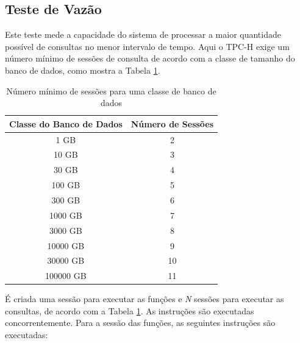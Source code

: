 \documentclass[conference]{IEEEtran}
\begin{document}
\subsection{Teste de Vazão}
\label{through_test}
Este teste mede a capacidade do sistema de processar a maior quantidade possível de consultas no menor intervalo de tempo. Aqui o TPC-H exige um número mínimo de sessões de consulta de acordo com a classe de tamanho do banco de dados, como mostra a Tabela \ref{min_sessions}.

\begin{table}[htpb]
\centering
\caption{Número mínimo de sessões para uma classe de banco de dados}
\label{min_sessions}
\begin{tabular}{|c|c|}
\hline
\multicolumn{1}{|c|}{\textbf{Classe do Banco de Dados}} & \textbf{Número de Sessões} \\ \hline
1 GB                                      & 2                            \\ \hline
10 GB                                      & 3                          \\ \hline
30 GB                                        & 4                             \\ \hline
100 GB                                        & 5                             \\ \hline
300 GB                                        & 6                             \\ \hline
1000 GB                                        & 7                             \\ \hline
3000 GB                                        & 8                             \\ \hline
10000 GB                                        & 9                             \\ \hline
30000 GB                                        & 10                             \\ \hline
100000 GB                                        & 11                             \\ \hline
\end{tabular}
\end{table}

É criada uma sessão para executar as funções e \textit{N} sessões para executar as consultas, de acordo com a Tabela \ref{min_sessions}. As instruções são executadas concorrentemente. Para a sessão das funções, as seguintes instruções são executadas:
\end{document}
